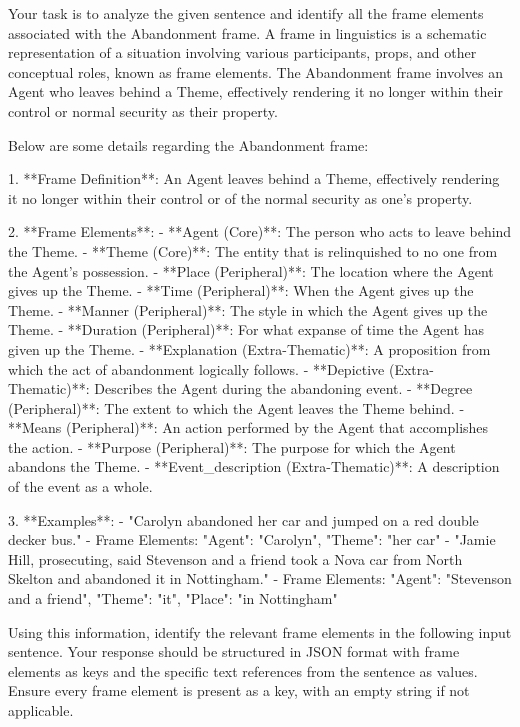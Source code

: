 Your task is to analyze the given sentence and identify all the frame elements associated with the Abandonment frame. A frame in linguistics is a schematic representation of a situation involving various participants, props, and other conceptual roles, known as frame elements. The Abandonment frame involves an Agent who leaves behind a Theme, effectively rendering it no longer within their control or normal security as their property.

Below are some details regarding the Abandonment frame:

1. **Frame Definition**: An Agent leaves behind a Theme, effectively rendering it no longer within their control or of the normal security as one's property.

2. **Frame Elements**:
    - **Agent (Core)**: The person who acts to leave behind the Theme.
    - **Theme (Core)**: The entity that is relinquished to no one from the Agent's possession.
    - **Place (Peripheral)**: The location where the Agent gives up the Theme.
    - **Time (Peripheral)**: When the Agent gives up the Theme.
    - **Manner (Peripheral)**: The style in which the Agent gives up the Theme.
    - **Duration (Peripheral)**: For what expanse of time the Agent has given up the Theme.
    - **Explanation (Extra-Thematic)**: A proposition from which the act of abandonment logically follows.
    - **Depictive (Extra-Thematic)**: Describes the Agent during the abandoning event.
    - **Degree (Peripheral)**: The extent to which the Agent leaves the Theme behind.
    - **Means (Peripheral)**: An action performed by the Agent that accomplishes the action.
    - **Purpose (Peripheral)**: The purpose for which the Agent abandons the Theme.
    - **Event_description (Extra-Thematic)**: A description of the event as a whole.

3. **Examples**:
    - "Carolyn abandoned her car and jumped on a red double decker bus." 
      - Frame Elements: {"Agent": "Carolyn", "Theme": "her car"}
    - "Jamie Hill, prosecuting, said Stevenson and a friend took a Nova car from North Skelton and abandoned it in Nottingham."
      - Frame Elements: {"Agent": "Stevenson and a friend", "Theme": "it", "Place": "in Nottingham"}

Using this information, identify the relevant frame elements in the following input sentence. Your response should be structured in JSON format with frame elements as keys and the specific text references from the sentence as values. Ensure every frame element is present as a key, with an empty string if not applicable.

